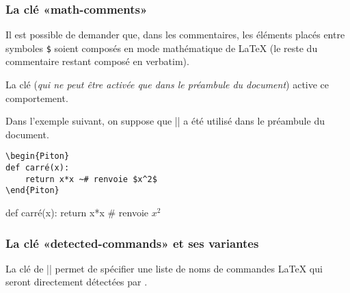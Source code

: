 \documentclass[dvipsnames,svgnames]{article}
\begin{document}
\subsubsection{La clé «math-comments»}


Il est possible de demander que, dans les commentaires, les éléments placés
entre symboles \texttt{\$} soient composés en mode mathématique de LaTeX (le
reste du commentaire restant composé en verbatim).

La clé  (\emph{qui ne peut être activée que dans le préambule du
  document}) active ce comportement.

\bigskip
Dans l'exemple suivant, on suppose que || a été utilisé dans
le préambule du document.

\begin{Verbatim}
\begin{Piton}
def carré(x):
    return x*x ~# renvoie $x^2$
\end{Piton}
\end{Verbatim}

\begin{Piton}
def carré(x):
    return x*x # renvoie $x^2$
\end{Piton}



\subsubsection{La clé «detected-commands» et ses variantes}

\label{detected-commands}
\label{raw-detected-commands}
\label{vertical-detected-commands}

La clé  de |\PitonOptions| permet de spécifier une liste de
noms de commandes LaTeX qui seront directement détectées par .
\end{document}
